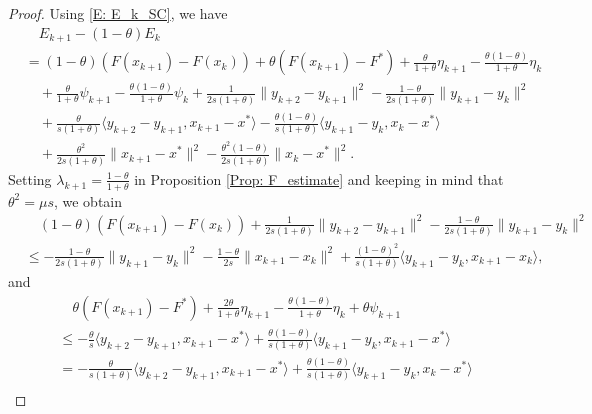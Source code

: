 \documentclass[pdflatex,sn-mathphys-num]{sn-jnl}
\theoremstyle{thmstyleone}
\theoremstyle{thmstyletwo}
\theoremstyle{thmstylethree}
\begin{document}
\begin{proof}
Using \eqref{E: E_k_SC}, we have
\begin{equation}\label{E: E_k_diff_SC}
\begin{aligned}
&\quad E_{k+1} - (1-\theta)E_k \\
&= (1-\theta)\left(F(x_{k+1}) - F(x_k)\right) + \theta\left( F(x_{k+1}) - F^* \right)
   + \frac{\theta}{1+\theta}\eta_{k+1}  
   - \frac{\theta(1-\theta)}{1+\theta}\eta_k\\
&\quad + \frac{\theta}{1+\theta}\psi_{k+1} 
  - \frac{\theta(1-\theta)}{1+\theta}\psi_k 
  + \frac{1}{2s(1+\theta)}\| y_{k+2} - y_{k+1} \|^2 - \frac{1-\theta}{2s(1+\theta)}\| y_{k+1} - y_k \|^2 \\
&\quad  + \frac{\theta}{s(1+\theta)} \langle y_{k+2}-y_{k+1}, x_{k+1}-x^* \rangle - \frac{\theta(1-\theta)}{s(1+\theta)}\langle y_{k+1} - y_k, x_k-x^* \rangle \\
&\quad + \frac{\theta^2}{2s(1+\theta)}\| x_{k+1} - x^* \|^2 - \frac{\theta^2(1-\theta)}{2s(1+\theta)}\| x_k - x^* \|^2.
\end{aligned}
\end{equation}
Setting $\lambda_{k+1} = \frac{1-\theta}{1+\theta}$ in Proposition \ref{Prop: F_estimate} and keeping in mind that $\theta^2=\mu s$, we obtain
\begin{equation}\label{E: func_gap_SC}
\begin{aligned}
&\quad (1-\theta)\left(F(x_{k+1}) - F(x_k) \right) + \frac{1}{2s(1+\theta)}\| y_{k+2} - y_{k+1} \|^2 - \frac{1-\theta}{2s(1+\theta)}\| y_{k+1} - y_k \|^2 \\
&\le - \frac{1-\theta}{2s(1+\theta)}\| y_{k+1} - y_k \|^2 - \frac{1-\theta}{2s}\| x_{k+1}-x_k \|^2 
+ \frac{(1-\theta)^2}{s(1+\theta)}\langle y_{k+1}-y_k, x_{k+1}-x_k \rangle, 
\end{aligned}
\end{equation} 
and
\begin{equation}\label{E: func_value_SC}
\begin{aligned}
&\quad \theta\left( F(x_{k+1}) - F^* \right) + \frac{2\theta}{1+\theta}\eta_{k+1} - \frac{\theta(1-\theta)}{1+\theta}\eta_k + \theta\psi_{k+1}\\
&\le -\frac{\theta}{s}\langle y_{k+2}-y_{k+1}, x_{k+1}-x^* \rangle + \frac{\theta(1-\theta)}{s(1+\theta)}\langle y_{k+1}-y_k, x_{k+1}-x^* \rangle \\
&= -\frac{\theta}{s(1+\theta)}\langle y_{k+2}-y_{k+1}, x_{k+1}-x^* \rangle
   + \frac{\theta(1-\theta)}{s(1+\theta)}\langle y_{k+1}-y_k, x_k-x^* \rangle \\

\end{aligned}
\end{equation}
\end{proof}
\end{document}
